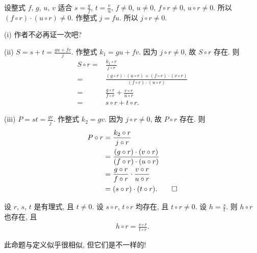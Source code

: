 \begin{pf}
    设整式 $f$, $g$, $u$, $v$ 适合 $s = \frac{g}{f}$, $t = \frac{v}{u}$, $f \neq 0$, $u \neq 0$, $f \circ r \neq 0$, $u \circ r \neq 0$. 所以 $(f \circ r) \cdot (u \circ r) \neq 0$. 作整式 $j = fu$. 所以 $j \circ r \neq 0$.

    (i) 作者不必再证一次吧?

    (ii) $S = s + t = \frac{gu + fv}{j}$. 作整式 $k_1 = gu + fv$. 因为 $j \circ r \neq 0$, 故 $S \circ r$ 存在. 则
    \begin{align*}
        S \circ r
        = {} & \frac{k_1 \circ r}{j \circ r}                                                                       \\
        = {} & \frac{(g \circ r) \cdot (u \circ r) + (f \circ r) \cdot (v \circ r)}{(f \circ r) \cdot (u \circ r)} \\
        = {} & \frac{g \circ r}{f \circ r} + \frac{v \circ r}{u \circ r}                                           \\
        = {} & s \circ r + t \circ r.
    \end{align*}

    (iii) $P = st = \frac{gv}{j}$. 作整式 $k_2 = gv$. 因为 $j \circ r \neq 0$, 故 $P \circ r$ 存在. 则
    \begin{align*}
        P \circ r
        = {} & \frac{k_2 \circ r}{j \circ r}                                       \\
        = {} & \frac{(g \circ r) \cdot (v \circ r)}{(f \circ r) \cdot (u \circ r)} \\
        = {} & \frac{g \circ r}{f \circ r} \cdot \frac{v \circ r}{u \circ r}       \\
        = {} & (s \circ r) \cdot (t \circ r). \qedhere
    \end{align*}
\end{pf}

\begin{proposition}
    设 $r$, $s$, $t$ 是有理式, 且 $t \neq 0$. 设 $s \circ r$, $t \circ r$ 均存在, 且 $t \circ r \neq 0$. 设 $h = \frac{s}{t}$. 则 $h \circ r$ 也存在, 且
    \begin{align*}
        h \circ r = \frac{s \circ r}{t \circ r}.
    \end{align*}
\end{proposition}

\begin{remark}
    此命题与定义似乎很相似, 但它们是不一样的!
\end{remark}


